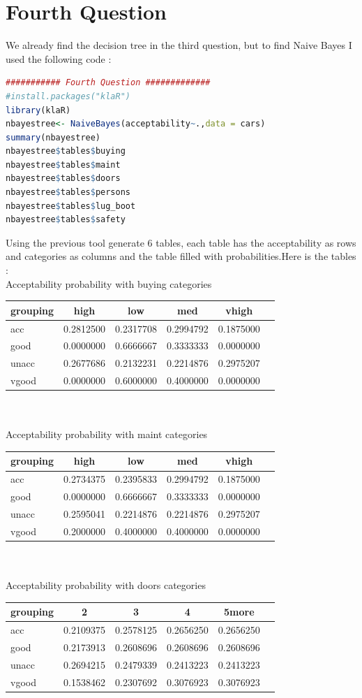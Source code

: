 \documentclass{article}
\begin{document}
\section*{Fourth Question}
We already find the decision tree in the third question, but to find Naive Bayes I used the following code :
\begin{lstlisting}[language=R]
########### Fourth Question #############
#install.packages("klaR")
library(klaR)
nbayestree<- NaiveBayes(acceptability~.,data = cars)
summary(nbayestree)
nbayestree$tables$buying
nbayestree$tables$maint
nbayestree$tables$doors
nbayestree$tables$persons
nbayestree$tables$lug_boot
nbayestree$tables$safety
\end{lstlisting}
Using the previous tool generate 6 tables, each table has the acceptability as rows and categories as columns and the table filled with probabilities.Here is the tables :\\
Acceptability  probability with buying categories\\
\begin{tabular}{|l|*{5}{c|}}
	\hline
	grouping&high&low&med&vhigh\\ \hline
	acc&0.2812500&0.2317708&0.2994792&0.1875000 \\ \hline
	good&0.0000000&0.6666667&0.3333333&0.0000000\\ \hline
	unacc&0.2677686&0.2132231&0.2214876&0.2975207\\ \hline
	vgood&0.0000000&0.6000000&0.4000000&0.0000000\\ \hline
\end{tabular}
\\\\Acceptability  probability with maint categories\\
\begin{tabular}{|l|*{5}{c|}}
\hline
grouping&high&low&med&vhigh\\ \hline
acc&0.2734375&0.2395833&0.2994792&0.1875000\\ \hline
good&0.0000000&0.6666667&0.3333333&0.0000000\\ \hline
unacc&0.2595041&0.2214876&0.2214876&0.2975207\\ \hline
vgood&0.2000000&0.4000000&0.4000000&0.0000000\\ \hline
\end{tabular}
\\\\Acceptability  probability with doors categories\\
\begin{tabular}{|l|*{5}{c|}}
	\hline
grouping&2&3&4&5more\\ \hline
acc&0.2109375&0.2578125&0.2656250&0.2656250\\ \hline
good&0.2173913&0.2608696&0.2608696&0.2608696\\ \hline
unacc&0.2694215&0.2479339&0.2413223&0.2413223\\ \hline
vgood&0.1538462&0.2307692&0.3076923&0.3076923\\ \hline
\end{tabular}
\end{document}

